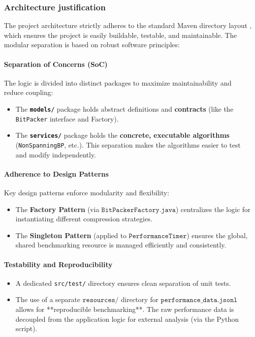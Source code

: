 \documentclass[11pt, a4paper]{article}
\begin{document}
	\subsubsection{Architecture justification}
	
	The project architecture strictly adheres to the standard Maven directory layout \cite{maven_dir}, which ensures the project is easily buildable, testable, and maintainable. The modular separation is based on robust software principles:
	
	\paragraph{Separation of Concerns (SoC) \cite{soc}}
	The logic is divided into distinct packages to maximize maintainability and reduce coupling:
	\begin{itemize}
		\item The \textbf{\texttt{models/}} package holds abstract definitions and \textbf{contracts} (like the \texttt{BitPacker} interface and Factory).
		\item The \textbf{\texttt{services/}} package holds the \textbf{concrete, executable algorithms} (\texttt{NonSpanningBP}, etc.). This separation makes the algorithms easier to test and modify independently.
	\end{itemize}
	
	\paragraph{Adherence to Design Patterns}
	Key design patterns enforce modularity and flexibility:
	\begin{itemize}
		\item The \textbf{Factory Pattern} (via $\texttt{BitPackerFactory.java}$) centralizes the logic for instantiating different compression strategies.
		\item The \textbf{Singleton Pattern} (applied to $\texttt{PerformanceTimer}$) ensures the global, shared benchmarking resource is managed efficiently and consistently.
	\end{itemize}
	
	\paragraph{Testability and Reproducibility}
	\begin{itemize}
		\item A dedicated \texttt{src/test/} directory ensures clean separation of unit tests.
		\item The use of a separate $\texttt{resources/}$ directory for $\texttt{performance\_data.jsonl}$ allows for **reproducible benchmarking**. The raw performance data is decoupled from the application logic for external analysis (via the Python script).
	\end{itemize}
	
\end{document}
